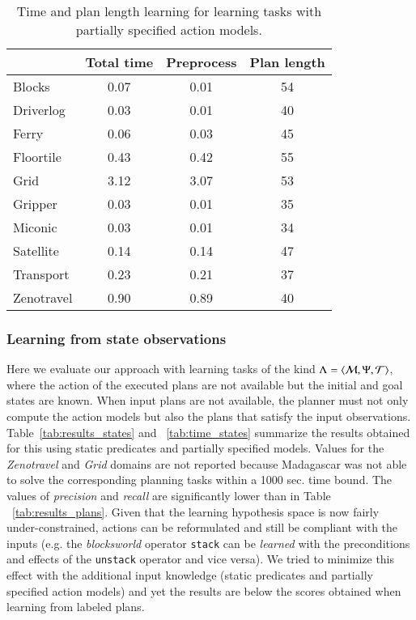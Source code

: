 \begin{table}
\begin{footnotesize}
	\begin{center}
		\begin{tabular}{l|c|c|c|}			
			 & Total time & Preprocess & Plan length  \\
                         \hline
			Blocks & 0.07 & 0.01 & 54  \\
			Driverlog & 0.03 & 0.01 & 40 \\
			Ferry & 0.06 & 0.03 & 45 \\
			Floortile & 0.43 & 0.42 & 55 \\
                        Grid & 3.12 & 3.07 & 53 \\
			Gripper & 0.03 & 0.01 & 35 \\
			Miconic & 0.03 & 0.01 & 34  \\
			Satellite & 0.14 & 0.14 & 47 \\
			Transport & 0.23 & 0.21 & 37 \\
			Zenotravel & 0.90 & 0.89 & 40 \\
		\end{tabular}
	\end{center}
        \end{footnotesize}
	\caption{\small Time and plan length learning for learning tasks with partially specified action models.}
	\label{tab:time_plans_partial}	
\end{table}


\subsubsection{Learning from state observations}
Here we evaluate our approach with learning tasks of the kind $\Lambda={\langle \mathcal{M},\Psi,\mathcal{T} \rangle}$, where the action of the executed plans are not available but the initial and goal states are known. When input plans are not available, the planner must not only compute the action models but also the plans that satisfy the input observations. Table~\ref{tab:results_states} and ~\ref{tab:time_states} summarize the results obtained for this using static predicates and partially specified models. Values for the {\em Zenotravel} and {\em Grid} domains are not reported because {\sc Madagascar} was not able to solve the corresponding planning tasks within a 1000 sec. time bound. The values of \emph{precision} and \emph{recall} are significantly lower than in Table ~\ref{tab:results_plans}. Given that the learning hypothesis space is now fairly under-constrained, actions can be reformulated and still be compliant with the inputs (e.g. the {\em blocksworld} operator {\small\tt stack} can be {\em learned} with the preconditions and effects of the {\small\tt unstack} operator and vice versa). We tried to minimize this effect with the additional input knowledge (static predicates and partially specified action models) and yet the results are below the scores obtained when learning from labeled plans.


